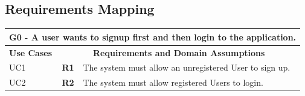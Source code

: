 \subsection{Requirements Mapping}

\begin{table}[htbp]
\centering
\begin{tabular}{|p{2.5cm}|p{1cm}|p{10.5cm}|}
\hline
\multicolumn{3}{|c|}{\textbf{G0 - A user wants to signup first and then login to the application.}} \\
\hline
\textbf{Use Cases} & \multicolumn{2}{c|}{\textbf{Requirements and Domain Assumptions}} \\
\hline
UC1 & \textbf{R1} & The system must allow an unregistered User to sign up. \\
\hline
UC2 & \textbf{R2} & The system must allow registered Users to login. \\
\hline
\end{tabular}
\end{table}

